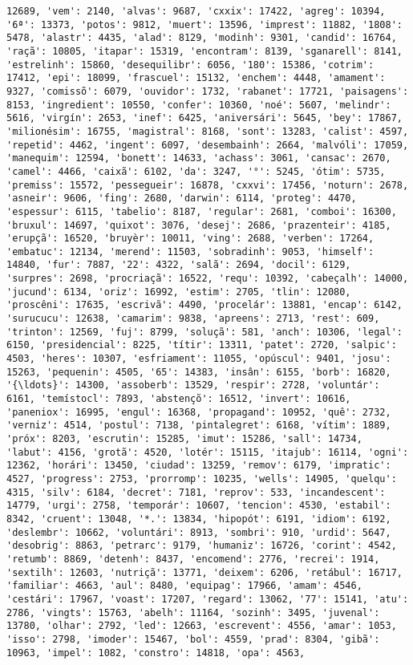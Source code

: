 \documentclass[11pt]{article}
\begin{document}
\begin{Verbatim}[commandchars=\\\{\}]
12689, 'vem': 2140, 'alvas': 9687, 'cxxix': 17422, 'agreg': 10394, '6ª': 13373, 'potos': 9812, 'muert': 13596, 'imprest': 11882, '1808': 5478, 'alastr': 4435, 'alad': 8129, 'modinh': 9301, 'candid': 16764, 'raçã': 10805, 'itapar': 15319, 'encontram': 8139, 'sganarell': 8141, 'estrelinh': 15860, 'desequilibr': 6056, '180': 15386, 'cotrim': 17412, 'epi': 18099, 'frascuel': 15132, 'enchem': 4448, 'amament': 9327, 'comissõ': 6079, 'ouvidor': 1732, 'rabanet': 17721, 'paisagens': 8153, 'ingredient': 10550, 'confer': 10360, 'noé': 5607, 'melindr': 5616, 'virgín': 2653, 'inef': 6425, 'aniversári': 5645, 'bey': 17867, 'milionésim': 16755, 'magistral': 8168, 'sont': 13283, 'calist': 4597, 'repetid': 4462, 'ingent': 6097, 'desembainh': 2664, 'malvóli': 17059, 'manequim': 12594, 'bonett': 14633, 'achass': 3061, 'cansac': 2670, 'camel': 4466, 'caixã': 6102, 'da': 3247, '°': 5245, 'ótim': 5735, 'premiss': 15572, 'pessegueir': 16878, 'cxxvi': 17456, 'noturn': 2678, 'asneir': 9606, 'fing': 2680, 'darwin': 6114, 'proteg': 4470, 'espessur': 6115, 'tabelio': 8187, 'regular': 2681, 'comboi': 16300, 'bruxul': 14697, 'quixot': 3076, 'desej': 2686, 'prazenteir': 4185, 'erupçã': 16520, 'bruyèr': 10011, 'ving': 2688, 'verben': 17264, 'embatuc': 12134, 'merend': 11503, 'sobradinh': 9053, 'himself': 14840, 'fur': 7887, '22': 4322, 'salã': 2694, 'docil': 6129, 'surpres': 2698, 'procriaçã': 16522, 'requ': 10392, 'cabeçalh': 14000, 'jucund': 6134, 'oriz': 16992, 'estim': 2705, 'tlin': 12080, 'proscêni': 17635, 'escrivã': 4490, 'procelár': 13881, 'encap': 6142, 'surucucu': 12638, 'camarim': 9838, 'apreens': 2713, 'rest': 609, 'trinton': 12569, 'fuj': 8799, 'soluçã': 581, 'anch': 10306, 'legal': 6150, 'presidencial': 8225, 'títir': 13311, 'patet': 2720, 'salpic': 4503, 'heres': 10307, 'esfriament': 11055, 'opúscul': 9401, 'josu': 15263, 'pequenin': 4505, '65': 14383, 'insân': 6155, 'borb': 16820, '{\ldots}': 14300, 'assoberb': 13529, 'respir': 2728, 'voluntár': 6161, 'temístocl': 7893, 'abstençõ': 16512, 'invert': 10616, 'paneniox': 16995, 'engul': 16368, 'propagand': 10952, 'quê': 2732, 'verniz': 4514, 'postul': 7138, 'pintalegret': 6168, 'vítim': 1889, 'próx': 8203, 'escrutin': 15285, 'imut': 15286, 'sall': 14734, 'labut': 4156, 'grotã': 4520, 'lotér': 15115, 'itajub': 16114, 'ogni': 12362, 'horári': 13450, 'ciudad': 13259, 'remov': 6179, 'impratic': 4527, 'progress': 2753, 'prorromp': 10235, 'wells': 14905, 'quelqu': 4315, 'silv': 6184, 'decret': 7181, 'reprov': 533, 'incandescent': 14779, 'urgi': 2758, 'temporár': 10607, 'tencion': 4530, 'estabil': 8342, 'cruent': 13048, '*.': 13834, 'hipopót': 6191, 'idiom': 6192, 'deslembr': 10662, 'voluntári': 8913, 'sombri': 910, 'urdid': 5647, 'desobrig': 8863, 'petrarc': 9179, 'humaniz': 16726, 'corint': 4542, 'retumb': 8869, 'detenh': 8437, 'encomend': 2776, 'recrei': 1914, 'sextilh': 12603, 'nutriçã': 13771, 'deixem': 6206, 'retábul': 16717, 'familiar': 4663, 'aul': 8480, 'equipag': 17966, 'amam': 4546, 'cestári': 17967, 'voast': 17207, 'regard': 13062, '77': 15141, 'atu': 2786, 'vingts': 15763, 'abelh': 11164, 'sozinh': 3495, 'juvenal': 13780, 'olhar': 2792, 'led': 12663, 'escrevent': 4556, 'amar': 1053, 'isso': 2798, 'imoder': 15467, 'bol': 4559, 'prad': 8304, 'gibã': 10963, 'impel': 1082, 'constro': 14818, 'opa': 4563, 
\end{Verbatim}
\end{document}
